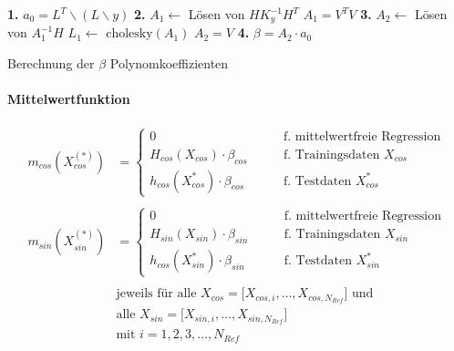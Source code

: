 \begin{algorithm}
	\SetAlgoLined
	\textbf{1.} $a_0 = L^T \backslash (L \backslash y)$\;
	\textbf{2.} $A_1 \leftarrow$ Lösen von $H K_y^{-1} H^T$\;
	\Indp
		$A_1 = V^T V$\;
		\Indm
	\textbf{3.} $A_2 \leftarrow$ Lösen von $A_1^{-1} H$\;
	\Indp
		$L_1 \leftarrow$ $\text{cholesky}(A_1)$\;
		$A_2 = V$\;
	\Indm
	\textbf{4.} $\beta = A_2 \cdot a_0$
	\caption{Berechnung der $\beta$ Polynomkoeffizienten}
	\label{alg:beta-koeffs}
\end{algorithm}


\paragraph*{Mittelwertfunktion}


\begin{align}\label{eq:gprmean}
	m_{cos}(X_{cos}^{(*)}) &=
		\begin{cases}
			0                                    &\qquad \text{f. mittelwertfreie Regression} \\
			H_{cos}(X_{cos}) \cdot \beta_{cos} 	 &\qquad \text{f. Trainingsdaten } X_{cos} \\
			h_{cos}(X_{cos}^*) \cdot \beta_{cos} &\qquad \text{f. Testdaten } X_{cos}^*
		\end{cases} \nonumber \\
	\\
	m_{sin}(X_{sin}^{(*)}) &=
		\begin{cases}
			0                                    &\qquad \text{f. mittelwertfreie Regression} \\
			H_{sin}(X_{sin}) \cdot \beta_{sin} 	 &\qquad \text{f. Trainingsdaten } X_{sin} \\
			h_{cos}(X_{sin}^*) \cdot \beta_{sin} &\qquad \text{f. Testdaten } X_{sin}^*
		\end{cases} \nonumber \\
	\nonumber \\
& \text{jeweils für alle } X_{cos} = \big[ X_{cos,i},\dots, X_{cos,N_{Ref}} \big] \text{ und } \nonumber \\
& \text{alle } X_{sin} = \big[ X_{sin,i},\dots, X_{sin,N_{Ref}} \big] \nonumber \\
& \text{mit } i = 1,2,3,\ldots,N_{Ref} \nonumber
\end{align}


